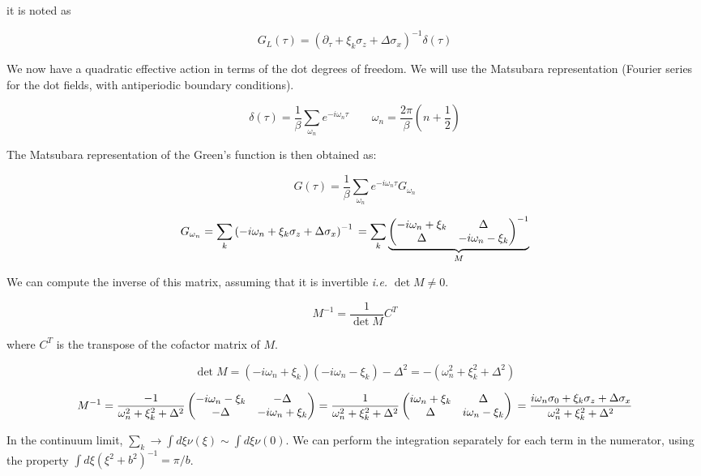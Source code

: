 it is noted as

\[ G_L(\tau) = (\partial_\tau + \xi_k \sigma_z + \Delta \sigma_x)^{-1} \delta(\tau)\]

We now have a quadratic effective action in terms of the dot degrees of
freedom. We will use the Matsubara representation (Fourier series for
the dot fields, with antiperiodic boundary conditions).

\[ \delta(\tau) = \frac{1}{\beta} \sum_{\omega_n} e^{-i\omega_n \tau} \qquad \omega_n = \frac{2\pi}{\beta}\left(n+\frac{1}{2}\right) \]

The Matsubara representation of the Green's function is then obtained
as:

\[ G(\tau) = \frac{1}{\beta} \sum_{\omega_n} e^{-i\omega_n \tau} G_{\omega_n}\]

\[ G_{\omega_n} = \sum_k \left(-i\omega_n + \xi_k \sigma_z + \Delta \sigma_x  \right)^{-1} \\ = \sum_k \underbrace{\begin{pmatrix}-i\omega_n + \xi_k & \Delta \\ \Delta & -i\omega_n -\xi_k \end{pmatrix}^{-1}}_{M}\]

We can compute the inverse of this matrix, assuming that it is
invertible \emph{i.e.} \(\det{M}\neq 0\).

\[ M^{-1} = \frac{1}{\det{M}} C^T\]

where \(C^T\) is the transpose of the cofactor matrix of \(M\).

\[\det{M} = (-i\omega_n + \xi_k)(-i\omega_n - \xi_k)-\Delta^2 = -(\omega_n^2 + \xi_k^2 + \Delta^2)\]

\[ M^{-1} = \frac{-1}{\omega_n^2 + \xi_k^2 + \Delta^2} \begin{pmatrix}-i\omega_n - \xi_k & -\Delta \\ -\Delta & -i\omega_n + \xi_k \end{pmatrix} = \frac{1}{\omega_n^2 + \xi_k^2 + \Delta^2} \begin{pmatrix}i\omega_n + \xi_k & \Delta \\ \Delta & i\omega_n - \xi_k \end{pmatrix} \\ = \frac{i\omega_n \sigma_0 + \xi_k \sigma_z + \Delta \sigma_x}{\omega_n^2 + \xi_k^2 + \Delta^2}\]

In the continuum limit,
\(\sum_k \rightarrow \int d\xi \nu(\xi) \sim \int d\xi \nu(0)\). We can
perform the integration separately for each term in the numerator, using
the property \(\int d\xi (\xi^2 + b^2)^{-1} = \pi/b\).

